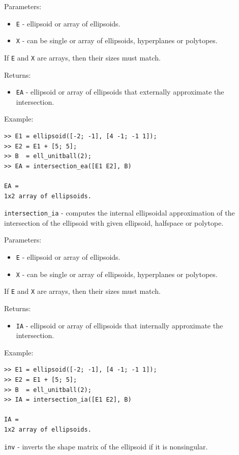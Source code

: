 \documentclass{report}
\begin{document}
Parameters:
\begin{itemize}
\item {\tt E} - ellipsoid or array of ellipsoids.
\item {\tt X} - can be single or array of ellipsoids, hyperplanes or polytopes.
\end{itemize}
If {\tt E} and {\tt X} are arrays, then their sizes must match.

Returns:
\begin{itemize}
\item {\tt EA} - ellipsoid or array of ellipsoids that externally approximate
the intersection.
\end{itemize}

Example:
{\tt \begin{verbatim}
>> E1 = ellipsoid([-2; -1], [4 -1; -1 1]);
>> E2 = E1 + [5; 5];
>> B  = ell_unitball(2);
>> EA = intersection_ea([E1 E2], B)

EA =
1x2 array of ellipsoids.
\end{verbatim} }

\newpage

{\Large {\tt intersection\_ia}} - computes the internal ellipsoidal
approximation of the intersection of the ellipsoid with given ellipsoid,
halfspace or polytope.

Parameters:
\begin{itemize}
\item {\tt E} - ellipsoid or array of ellipsoids.
\item {\tt X} - can be single or array of ellipsoids, hyperplanes or polytopes.
\end{itemize}
If {\tt E} and {\tt X} are arrays, then their sizes must match.

Returns:
\begin{itemize}
\item {\tt IA} - ellipsoid or array of ellipsoids that internally approximate
the intersection.
\end{itemize}

Example:
{\tt \begin{verbatim}
>> E1 = ellipsoid([-2; -1], [4 -1; -1 1]);
>> E2 = E1 + [5; 5];
>> B  = ell_unitball(2);
>> IA = intersection_ia([E1 E2], B)

IA =
1x2 array of ellipsoids.
\end{verbatim} }

\newpage

{\Large {\tt inv}} - inverts the shape matrix of the ellipsoid if it is
nonsingular.
\end{document}
